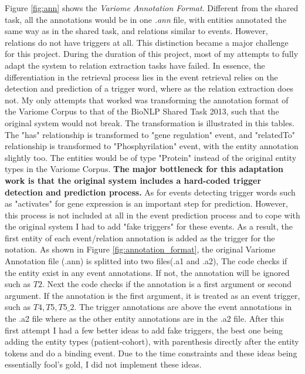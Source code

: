Figure \ref{fig:ann} shows the \emph{Variome Annotation Format}. Different from the shared task, all the annotations would be in one \emph{.ann} file, with entities annotated the same way as in the shared task, and relations similar to events. However, relations do not have triggers at all. This distinction became a major challenge for this project. During the duration of this project, most of my attempts to fully adapt the system to relation extraction tasks have failed. In essence, the differentiation in the retrieval process lies in the event retrieval relies on the detection and prediction of a trigger word, where as the relation extraction does not. \newline\newline
My only attempts that worked was transforming the annotation format of the Variome Corpus to that of the BioNLP Shared Task 2013, such that the original system would not break. The transformation is illustrated in this tables. The "has" relationship is transformed to "gene regulation" event, and "relatedTo" relationship is transformed to "Phosphyrilation" event, with the entity annotation slightly too. The entities would be of type "Protein" instead of the original entity types in the Variome Corpus. \textbf{The major bottleneck for this adaptation work is that the original system includes a hard-coded trigger detection and prediction process.} As for events detecting trigger words such as "activates" for gene expression is an important step for prediction. However, this process is not included at all in the event prediction process and to cope with the original system I had to add "fake triggers" for these events. As a result, the first entity of each event/relation annotation is added as the trigger for the notation. \newline\newline
As shown in Figure \ref{fig:annotation_format}, the original Variome Annotation file (.ann) is splitted into two files(.a1 and .a2), The code checks if the entity exist in any event annotations. If not, the annotation will be ignored such as $T2$. Next the code checks if the annotation is a first argument or second argument. If the annotation is the first argument, it is treated as an event trigger, such as $T4, T5, T5\_2$. The trigger annotations are above the event annotations in the .a2 file where as the other entity annotations are in the .a2 file. 
After this first attempt I had a few better ideas to add fake triggers, the best one being adding the entity types (patient-cohort), with parenthesis directly after the entity tokens and do a binding event. Due to the time constraints and these ideas being essentially fool's gold, I did not implement these ideas.


